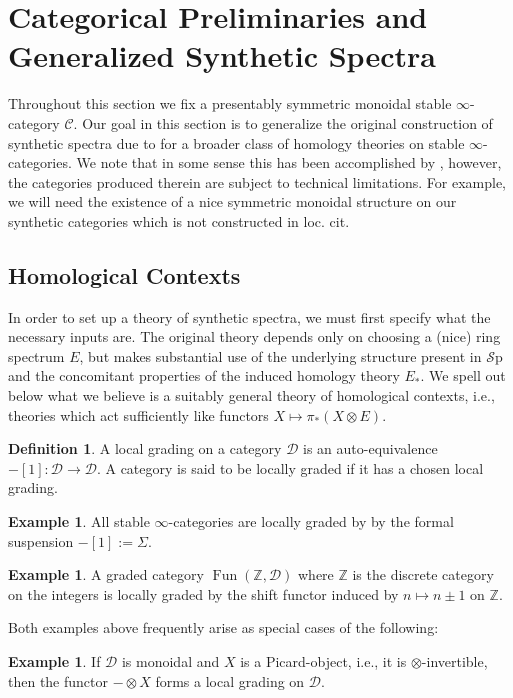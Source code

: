 \documentclass[10pt]{amsart}
\theoremstyle{definition}
\numberwithin{figure}{section}
\numberwithin{equation}{section}
\newtheorem{definition}[figure]{Definition}
\newtheorem{example}[figure]{Example}
\newcommand{\cC}{\mathcal{C}}
\newcommand{\cD}{\mathcal{D}}
\theoremstyle{cited}
\newcommand{\bZ}{\mathbb{Z}}
\newcommand{\Fun}{\operatorname{Fun}}
\newcommand{\Sp}{{\mathcal{S}\mathrm{p}}}
\begin{document}
\section{Categorical Preliminaries and Generalized Synthetic Spectra}

Throughout this section we fix a presentably symmetric monoidal stable $\infty$-category $\cC$. Our goal in this section is to generalize the original construction of synthetic spectra due to \cite{Pst22} for a broader class of homology theories on stable $\infty$-categories. We note that in some sense this has been accomplished by \cite{PP23}, however, the categories produced therein are subject to technical limitations. For example, we will need the existence of a nice symmetric monoidal structure on our synthetic categories which is not constructed in loc. cit.

\subsection{Homological Contexts} In order to set up a theory of synthetic spectra, we must first specify what the necessary inputs are. The original theory depends only on choosing a (nice) ring spectrum $E$, but makes substantial use of the underlying structure present in $\Sp$ and the concomitant properties of the induced homology theory $E_*$. We spell out below what we believe is a suitably general theory of homological contexts, i.e., theories which act sufficiently like functors $X\mapsto \pi_*(X\otimes E)$.


\begin{definition}
  A local grading on a category $\cD$ is an auto-equivalence $-[1]:\cD\to \cD$. A category is said to be locally graded if it has a chosen local grading.
\end{definition}

\begin{example}
  All stable $\infty$-categories are locally graded by by the formal suspension $-[1]:=\Sigma$. 
\end{example}

\begin{example}
  A graded category $\Fun(\bZ,\cD)$ where $\bZ$ is the discrete category on the integers is locally graded by the shift functor induced by $n\mapsto n\pm 1$ on $\bZ$.
\end{example}

Both examples above frequently arise as special cases of the following:

\begin{example}
  If $\cD$ is monoidal and $X$ is a Picard-object, i.e., it is $\otimes$-invertible, then the functor $-\otimes X$ forms a local grading on $\cD$.
\end{example}
\end{document}
